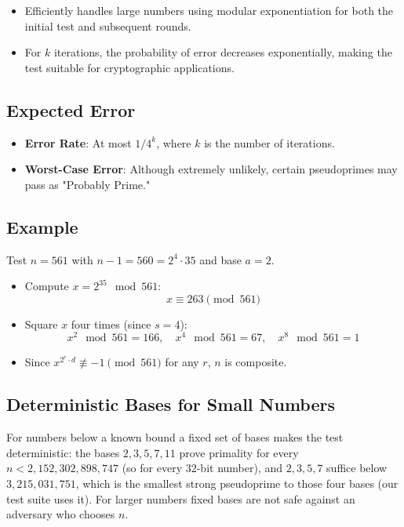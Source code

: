 \documentclass[12pt]{article}
\begin{document}
\begin{itemize}
    \item Efficiently handles large numbers using modular exponentiation for both the initial test and subsequent rounds.
    \item For \( k \) iterations, the probability of error decreases exponentially, making the test suitable for cryptographic applications.
\end{itemize}

\subsection*{Expected Error}

\begin{itemize}
    \item \textbf{Error Rate}: At most \( 1 / 4^k \), where \( k \) is the number of iterations.
    \item \textbf{Worst-Case Error}: Although extremely unlikely, certain pseudoprimes may pass as "Probably Prime."
\end{itemize}

\subsection*{Example}

Test \( n = 561 \) with \( n-1 = 560 = 2^4 \cdot 35 \) and base \( a = 2 \).

\begin{itemize}
    \item Compute \( x = 2^{35} \mod 561 \):
    \[
    x \equiv 263 \pmod{561}
    \]
    \item Square \( x \) four times (since \( s = 4 \)):
    \[
    x^2 \mod 561 = 166, \quad x^4 \mod 561 = 67, \quad x^8 \mod 561 = 1
    \]
    \item Since \( x^{2^r \cdot d} \not\equiv -1 \pmod{561} \) for any \( r \), \( n \) is composite.
\end{itemize}

\subsection*{Deterministic Bases for Small Numbers}

For numbers below a known bound a fixed set of bases makes the test deterministic: the bases \( 2, 3, 5, 7, 11 \) prove primality for every \( n < 2{,}152{,}302{,}898{,}747 \) (so for every \( 32 \)-bit number), and \( 2, 3, 5, 7 \) suffice below \( 3{,}215{,}031{,}751 \), which is the smallest strong pseudoprime to those four bases (our test suite uses it). For larger numbers fixed bases are not safe against an adversary who chooses \( n \).
\end{document}
